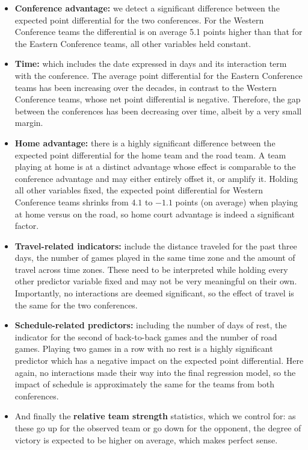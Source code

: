 \documentclass[
    12pt,
    a4paper,
    titlepage,  %
    abstract,  %
    headings=standardclasses,  %
    bibliography=totocnumbered  %
]{scrartcl}
\begin{document}
\begin{itemize}
    \item \textbf{Conference advantage:} we detect a significant difference between the expected point differential for the two conferences. For the Western Conference teams the differential is on average 5.1 points higher than that for the Eastern Conference teams, all other variables held constant.
    \item \textbf{Time:} which includes the date expressed in days and its interaction term with the conference. The average point differential for the Eastern Conference teams has been increasing over the decades, in contrast to the Western Conference teams, whose net point differential is negative. Therefore, the gap between the conferences has been decreasing over time, albeit by a very small margin.
    \item \textbf{Home advantage:} there is a highly significant difference between the expected point differential for the home team and the road team. A team playing at home is at a distinct advantage whose effect is comparable to the conference advantage and may either entirely offset it, or amplify it. Holding all other variables fixed, the expected point differential for Western Conference teams shrinks from $4.1$ to $-1.1$ points (on average) when playing at home versus on the road, so home court advantage is indeed a significant factor.
    \item \textbf{Travel-related indicators:} include the distance traveled for the past three days, the number of games played in the same time zone and the amount of travel across time zones. These need to be interpreted while holding every other predictor variable fixed and may not be very meaningful on their own. Importantly, no interactions are deemed significant, so the effect of travel is the same for the two conferences.
    \item \textbf{Schedule-related predictors:} including the number of days of rest, the indicator for the second of back-to-back games and the number of road games. Playing two games in a row with no rest is a highly significant predictor which has a negative impact on the expected point differential. Here again, no interactions made their way into the final regression model, so the impact of schedule is approximately the same for the teams from both conferences.
    \item And finally the \textbf{relative team strength} statistics, which we control for: as these go up for the observed team or go down for the opponent, the degree of victory is expected to be higher on average, which makes perfect sense.
\end{itemize}
\end{document}
